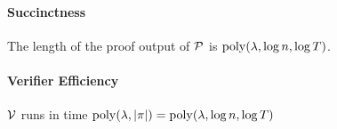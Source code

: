 \begin{definition}
\paragraph{Succinctness} The length of the proof output of $\mathcal{P}$ is $\operatorname{poly}(\lambda, \log n,\log T)$.
\paragraph{Verifier Efficiency} $\mathcal{V}$ runs in time $\operatorname{poly}(\lambda, |\pi|) = \operatorname{poly}(\lambda, \log n, \log T)$    
\end{definition}


